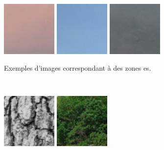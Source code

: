 \begin{figure}[htb]
    \centering
    \begin{subfigure}[t]{0.45\textwidth}
        \centering
        \includegraphics[width=0.3\textwidth]{images/asari/LTP/patch_l1}
        \includegraphics[width=0.3\textwidth]{images/asari/LTP/patch_l2}
        \includegraphics[width=0.3\textwidth]{images/asari/LTP/patch_l3}
        \caption{Exemples d'images correspondant à des zones es.}
    \end{subfigure}%
    \\
    \begin{subfigure}[t]{0.45\textwidth}
        \centering
        \includegraphics[width=0.3\textwidth]{images/asari/LTP/patch_nl1}
        \includegraphics[width=0.3\textwidth]{images/asari/LTP/patch_nl2}

\end{subfigure}
\end{figure}
